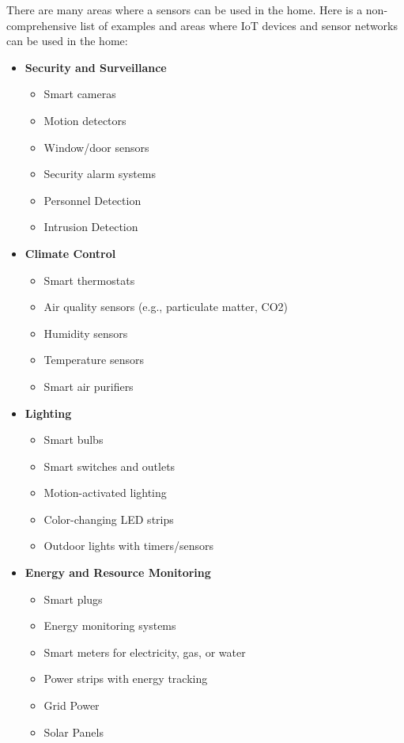 \documentclass[10pt, journal]{IEEEtran} %
\begin{document}
There are many areas where a sensors can be used in the home.
Here is a non-comprehensive list of examples and areas where
IoT devices and sensor networks can be used in the home:

\begin{itemize}[]
    \item{\textbf{Security and Surveillance}}
        \begin{itemize}
            \item Smart cameras
            \item Motion detectors
            \item Window/door sensors
            \item Security alarm systems
            \item Personnel Detection
            \item Intrusion Detection
        \end{itemize}

    \item{\textbf{Climate Control}}
        \begin{itemize}
            \item Smart thermostats
            \item Air quality sensors (e.g., particulate matter, CO2)
            \item Humidity sensors
            \item Temperature sensors
            \item Smart air purifiers
        \end{itemize}

    \item{\textbf{Lighting}}
        \begin{itemize}
            \item Smart bulbs
            \item Smart switches and outlets
            \item Motion-activated lighting
            \item Color-changing LED strips
            \item Outdoor lights with timers/sensors
        \end{itemize}

    \item{\textbf{Energy and Resource Monitoring}}
        \begin{itemize}
            \item Smart plugs
            \item Energy monitoring systems
            \item Smart meters for electricity, gas, or water
            \item Power strips with energy tracking
            \item Grid Power
            \item Solar Panels
        \end{itemize}


\end{itemize}
\end{document}
